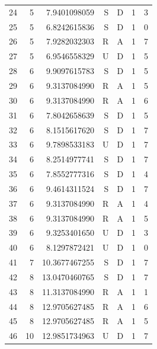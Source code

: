 \begin{longtable}{rrrrrrr}
24 & 5 & 7.9401098059 & S & D & 1 & 3\\
25 & 5 & 6.8242615836 & S & D & 1 & 0\\
26 & 5 & 7.9282032303 & R & A & 1 & 7\\
27 & 5 & 6.9546558329 & U & D & 1 & 5\\
28 & 6 & 9.9097615783 & S & D & 1 & 5\\
29 & 6 & 9.3137084990 & R & A & 1 & 5\\
30 & 6 & 9.3137084990 & R & A & 1 & 6\\
31 & 6 & 7.8042658639 & S & D & 1 & 5\\
32 & 6 & 8.1515617620 & S & D & 1 & 7\\
33 & 6 & 9.7898533183 & U & D & 1 & 7\\
34 & 6 & 8.2514977741 & S & D & 1 & 7\\
35 & 6 & 7.8552777316 & S & D & 1 & 4\\
36 & 6 & 9.4614311524 & S & D & 1 & 7\\
37 & 6 & 9.3137084990 & R & A & 1 & 4\\
38 & 6 & 9.3137084990 & R & A & 1 & 5\\
39 & 6 & 9.3253401650 & U & D & 1 & 3\\
40 & 6 & 8.1297872421 & U & D & 1 & 0\\
41 & 7 & 10.3677467255 & S & D & 1 & 7\\
42 & 8 & 13.0470460765 & S & D & 1 & 7\\
43 & 8 & 11.3137084990 & R & A & 1 & 1\\
44 & 8 & 12.9705627485 & R & A & 1 & 6\\
45 & 8 & 12.9705627485 & R & A & 1 & 5\\
46 & 10 & 12.9851734963 & U & D & 1 & 7\\
\end{longtable}
